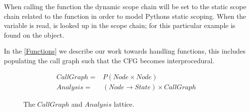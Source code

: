 When calling the function the dynamic scope chain will be set to the static scope chain related to the function  in order to model Pythons static scoping. When the variable  is read,  is looked up in the scope chain; for this particular example  is found on the  object.

In the \autoref{Functions} we describe our work towards handling functions, this includes populating the call graph such that the CFG becomes interprocedural.

\begin{figure}[H]
\begin{eqnarray*}
CallGraph = & P(Node \times Node) \\
Analysis = & (Node \rightarrow State) \times CallGraph
\end{eqnarray*}
\vspace{-15pt}
\caption{The $CallGraph$ and $Analysis$ lattice.}
\label{lattice:Analysis}
\end{figure}
